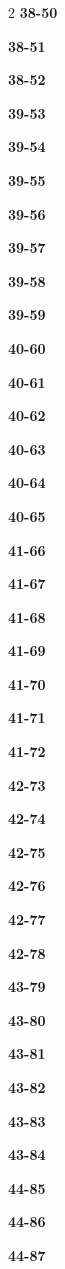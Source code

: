 \documentclass[10pt,a4paper]{article}
\begin{document}
\begin{multicols}{2}
\noindent\textbf{38-50}\ \par
\noindent\textbf{38-51}\ \par
\noindent\textbf{38-52}\ \par
\noindent\textbf{39-53}\ \par
\noindent\textbf{39-54}\ \par
\noindent\textbf{39-55}\ \par
\noindent\textbf{39-56}\ \par
\noindent\textbf{39-57}\ \par
\noindent\textbf{39-58}\ \par
\noindent\textbf{39-59}\ \par
\noindent\textbf{40-60}\ \par
\noindent\textbf{40-61}\ \par
\noindent\textbf{40-62}\ \par
\noindent\textbf{40-63}\ \par
\noindent\textbf{40-64}\ \par
\noindent\textbf{40-65}\ \par
\noindent\textbf{41-66}\ \par
\noindent\textbf{41-67}\ \par
\noindent\textbf{41-68}\ \par
\noindent\textbf{41-69}\ \par
\noindent\textbf{41-70}\ \par
\noindent\textbf{41-71}\ \par
\noindent\textbf{41-72}\ \par
\noindent\textbf{42-73}\ \par
\noindent\textbf{42-74}\ \par
\noindent\textbf{42-75}\ \par
\noindent\textbf{42-76}\ \par
\noindent\textbf{42-77}\ \par
\noindent\textbf{42-78}\ \par
\noindent\textbf{43-79}\ \par
\noindent\textbf{43-80}\ \par
\noindent\textbf{43-81}\ \par
\noindent\textbf{43-82}\ \par
\noindent\textbf{43-83}\ \par
\noindent\textbf{43-84}\ \par
\noindent\textbf{44-85}\ \par
\noindent\textbf{44-86}\ \par
\noindent\textbf{44-87}\ \par

\end{multicols}
\end{document}
